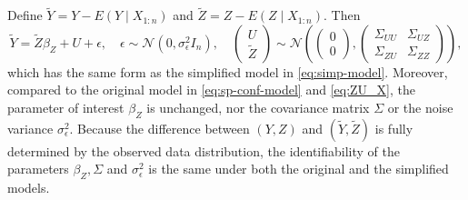 \documentclass[11pt]{article}
\theoremstyle{definition}
\theoremstyle{remark}
\begin{document}
Define $\tilde{Y} = Y- E(Y\mid X_{1:n})$ and $\tilde{Z} = Z - E(Z\mid X_{1:n})$. Then
\[
\tilde{Y} =
\tilde{Z}\beta_Z + U + \epsilon, 
\quad 
\epsilon \sim \mathcal{N}(0, \sigma_{\epsilon}^2 I_n), 
\quad 
\begin{pmatrix}
        U\\
        \tilde{Z}
    \end{pmatrix} 
    \sim \mathcal{N}
    \left(  
    \begin{pmatrix}
        0\\
        0
    \end{pmatrix}, 
    \begin{pmatrix}
        \Sigma_{UU} & \Sigma_{UZ}\\
        \Sigma_{ZU} & \Sigma_{ZZ}
    \end{pmatrix}
    \right), 
\] 
which 
has the same form as the simplified model in \eqref{eq:simp-model}.
Moreover, 
compared to the original model in \eqref{eq:sp-conf-model} and \eqref{eq:ZU_X}, 
the parameter of interest $\beta_Z$ is unchanged,  
nor the covariance matrix $\Sigma$ or the noise variance $\sigma^2_\epsilon$.
Because the difference between $(Y,Z)$ and $(\tilde{Y}, \tilde{Z})$ is fully determined by the observed data distribution, 
the identifiability of the parameters $\beta_Z, \Sigma$ and $\sigma^2_\epsilon$ is the same under both the original and the simplified models. 
\end{document}

